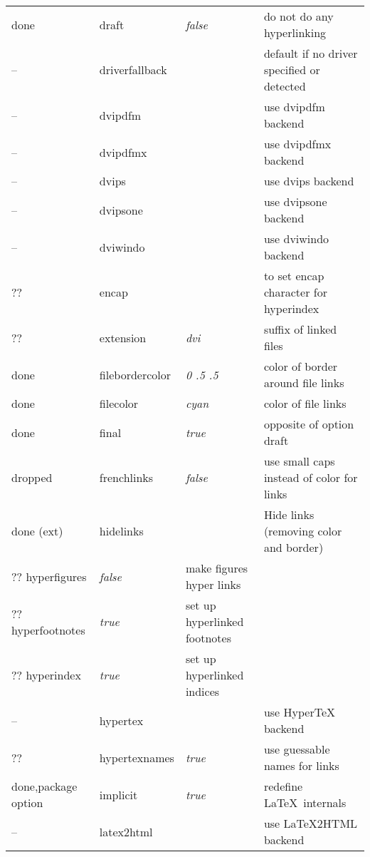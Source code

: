 \begin{longtable}{@{}l>{\ttfamily}llp{7cm}@{}}
done   & draft              & \textit{false}         & do not do any hyperlinking \\
--     & driverfallback     &                        & default if no driver specified or detected\\
--     & dvipdfm            &                        & use \textsf{dvipdfm} backend \\
--     & dvipdfmx           &                        & use \textsf{dvipdfmx} backend \\
--     & dvips              &                        & use \textsf{dvips} backend \\
--     & dvipsone           &                        & use \textsf{dvipsone} backend \\
--     & dviwindo           &                        & use \textsf{dviwindo} backend \\
??   &encap              &                        & to set encap character for hyperindex \\
??   &extension          & \textit{dvi}           & suffix of linked files \\
done &filebordercolor    & \textit{0 .5 .5}       & color of border around file links \\
done &filecolor          & \textit{cyan}          & color of file links \\
done   &final              & \textit{true}          & opposite of option draft \\
dropped &frenchlinks        & \textit{false}         & use small caps instead of color for links \\
done (ext) & hidelinks          &                        & Hide links (removing color and border) \\
?? hyperfigures       & \textit{false}         & make figures hyper links \\
?? hyperfootnotes     & \textit{true}          & set up hyperlinked footnotes \\
?? hyperindex         & \textit{true}          & set up hyperlinked indices \\
-- & hypertex           &                        & use \textsf{Hyper\TeX} backend \\
?? & hypertexnames      & \textit{true}          & use guessable names for links \\
done,package option & implicit           & \textit{true}          & redefine \LaTeX\ internals \\
-- & latex2html         &                        & use \textsf{\LaTeX2HTML} backend \\

\end{longtable}
